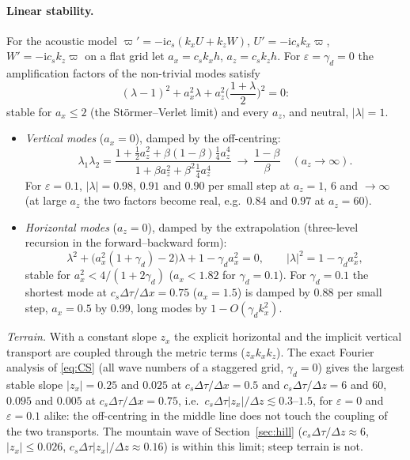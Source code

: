 \documentclass[11pt,a4paper]{article}
\newcommand{\dtau}{\Delta\tau}
\newcommand{\pv}{\varpi}      %
\begin{document}
\paragraph{Linear stability.} For the acoustic model $\pv'=-\mathrm ic_s(k_xU+k_zW)$, $U'=-\mathrm ic_sk_x\pv$,
$W'=-\mathrm ic_sk_z\pv$ on a flat grid let $a_x=c_sk_xh$, $a_z=c_sk_zh$. For $\varepsilon=\gamma_d=0$ the amplification factors of
the non-trivial modes satisfy \cite{verletei}
\[
(\lambda-1)^2+a_x^2\lambda+a_z^2\Big(\frac{1+\lambda}2\Big)^2=0 :
\]
stable for $a_x\le2$ (the Störmer--Verlet limit) and every $a_z$, and neutral, $|\lambda|=1$.
\begin{itemize}
\item \emph{Vertical modes} ($a_x=0$), damped by the off-centring:
\[
\lambda_1\lambda_2=\frac{1+\tfrac12a_z^2+\beta(1-\beta)\tfrac14a_z^4}{1+\beta a_z^2+\beta^2\tfrac14a_z^4}\ \longrightarrow\ \frac{1-\beta}\beta\quad(a_z\to\infty).
\]
For $\varepsilon=0.1$, $|\lambda|=0.98$, $0.91$ and $0.90$ per small step at $a_z=1$, 6 and $\to\infty$ (at large $a_z$ the two factors
become real, e.g.\ $0.84$ and $0.97$ at $a_z=60$).
\item \emph{Horizontal modes} ($a_z=0$), damped by the extrapolation (three-level recursion in the
forward--backward form):
\[
\lambda^2+\big(a_x^2(1+\gamma_d)-2\big)\lambda+1-\gamma_da_x^2=0,\qquad|\lambda|^2=1-\gamma_da_x^2,
\]
stable for $a_x^2<4/(1+2\gamma_d)$ ($a_x<1.82$ for $\gamma_d=0.1$). For $\gamma_d=0.1$ the shortest mode at $c_s\dtau/\Delta x=0.75$
($a_x=1.5$) is damped by 0.88 per small step, $a_x=0.5$ by 0.99, long modes by $1-O(\gamma_dk_x^2)$.
\end{itemize}
\emph{Terrain.} With a constant slope $z_x$ the explicit horizontal and the implicit vertical transport are coupled
through the metric terms ($z_xk_xk_z$). The exact Fourier analysis of \eqref{eq:CS} (all wave numbers of a staggered
grid, $\gamma_d=0$) gives the largest stable slope $|z_x|=0.25$ and $0.025$ at $c_s\dtau/\Delta x=0.5$ and $c_s\dtau/\Delta z=6$ and 60,
$0.095$ and $0.005$ at $c_s\dtau/\Delta x=0.75$, i.e.\ $c_s\dtau|z_x|/\Delta z\lesssim0.3$--$1.5$, for $\varepsilon=0$ and $\varepsilon=0.1$ alike: the off-centring
in the middle line does not touch the coupling of the two transports. The mountain wave of
Section~\ref{sec:hill} ($c_s\dtau/\Delta z\approx6$, $|z_x|\le0.026$, $c_s\dtau|z_x|/\Delta z\approx0.16$) is within this limit; steep terrain is not.
\end{document}
